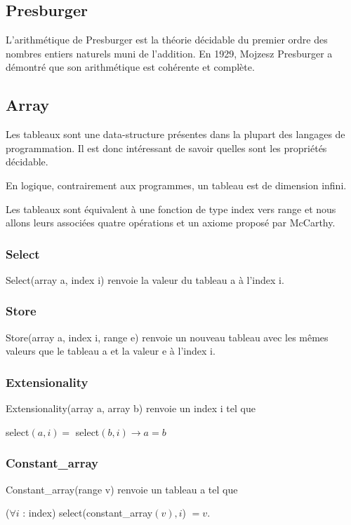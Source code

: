 \documentclass[9pt]{book}
\begin{document}
 		\subsection{Presburger}
 			L'arithm\'etique de Presburger est la th\'eorie  d\'ecidable du premier ordre des nombres entiers naturels muni de l'addition. En 1929, Mojzesz Presburger a d\'emontr\'e que son arithm\'etique est coh\'erente et compl\`ete.
 		\subsection{Array}
 			Les tableaux sont une data-structure pr\'esentes dans la plupart des langages de programmation. Il est donc int\'eressant de savoir quelles sont les propri\'et\'es d\'ecidable. \par

 			En logique, contrairement aux programmes, un tableau est de dimension infini. \par
 			Les tableaux sont \'equivalent \`a une fonction de type index vers range et nous allons leurs associ\'ees quatre op\'erations et un axiome propos\'e par McCarthy. \par
 			\subsubsection{Select}
 			Select(array a, index i) renvoie la valeur du tableau a \`a l'index i.\par
			 \subsubsection{Store}
			Store(array a, index i, range e) renvoie un nouveau tableau avec les m\^emes valeurs que le tableau a et la valeur e \`a l'index i.

 			\subsubsection{Extensionality}
 			Extensionality(array a, array b) renvoie un index i tel que
\par select$(a,i) = $ select$(b,i)\rightarrow a = b $

 			\subsubsection{Constant\_array}
 			Constant\_array(range v) renvoie un tableau a tel que \par
 			($\forall i$ : index) select(constant\_array$(v),i$) $= v$.
\end{document}

